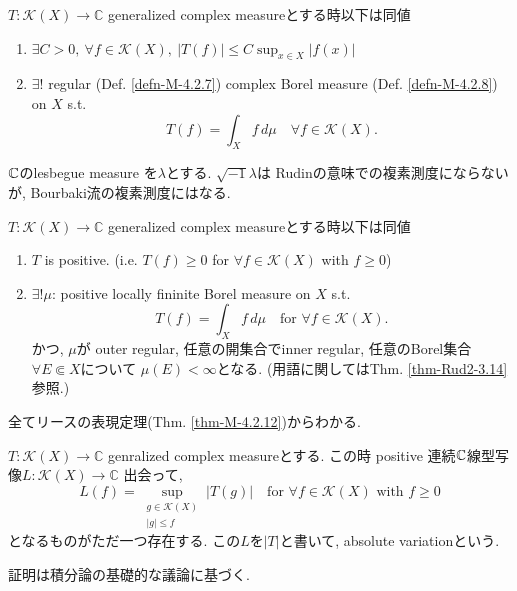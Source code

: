 \begin{rem}
$T:\mathcal{K}(X)\to \mathbb{C}$ generalized complex measureとする時以下は同値
\begin{enumerate}
\item $\exists C>0,\ \forall f\in \mathcal{K}(X),\ |T(f)|\leq C\sup_{x\in X}|f(x)|$
\item $\exists!$ regular (Def. \ref{defn-M-4.2.7}) complex Borel measure  (Def. \ref{defn-M-4.2.8})  on $X$ s.t.
\begin{equation*}
T(f)=\int_X f\,d\mu \quad \forall f\in \mathcal{K}(X).
\end{equation*}
\end{enumerate}

$\mathbb{C}$のlesbegue measure を$\lambda$とする. $\sqrt{-1}\lambda$は
Rudinの意味での複素測度にならないが, Bourbaki流の複素測度にはなる. 
\end{rem}


\begin{rem}
 $T:\mathcal{K}(X)\to \mathbb{C}$ generalized complex measureとする時以下は同値

\begin{enumerate}
\item $T$ is positive. (i.e. $T(f)\geq 0$ for $\forall f\in \mathcal{K}(X)$ with $f\geq 0$)
\item  $\exists!\mu$: positive  locally  fininite Borel measure  on $X$ s.t.
\begin{equation*}
T(f)=\int_X f\,d\mu \quad \text{for } \forall f\in \mathcal{K}(X).
\end{equation*}
かつ, $\mu$が outer regular, 任意の開集合でinner regular, 
任意のBorel集合$\forall E\Subset X$について $\mu(E)<\infty$となる. (用語に関してはThm. \ref{thm-Rud2-3.14}参照.)
\end{enumerate}
\end{rem}
全てリースの表現定理(Thm. \ref{thm-M-4.2.12})からわかる.

\begin{tcolorbox}[mybox]
\begin{lem}
$T:\mathcal{K}(X)\to \mathbb{C}$ genralized complex measureとする.
この時
positive 連続$\mathbb{C}$線型写像$ L:\mathcal{K}(X)\to \mathbb{C}$
出会って, \begin{equation*}
L(f)=\sup_{\substack{g\in \mathcal{K}(X)\\ |g|\leq f}} |T(g)| \quad \text{for } \forall f\in \mathcal{K}(X) \text{ with } f\geq 0
\end{equation*}
となるものがただ一つ存在する. 
この$L$を$|T|$と書いて, absolute variationという. 
\end{lem}
\end{tcolorbox}
証明は積分論の基礎的な議論に基づく. 

